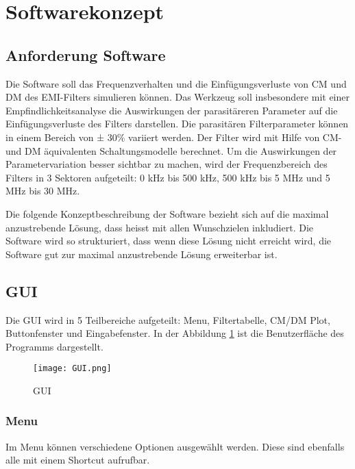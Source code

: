 \section{Softwarekonzept} \label{sec:softwarekonzept}

\subsection{Anforderung Software} \label{subsec:anforderungSoftware}

Die Software soll das Frequenzverhalten und die Einfügungsverluste von CM und DM des EMI-Filters simulieren können. Das Werkzeug soll insbesondere mit einer Empfindlichkeitsanalyse die Auswirkungen der parasitäreren Parameter auf die Einfügungsverluste des Filters darstellen. Die parasitären Filterparameter können in einem Bereich von ± 30\% variiert werden. Der Filter wird mit Hilfe von CM- und DM äquivalenten Schaltungsmodelle berechnet. Um die Auswirkungen der Parametervariation besser sichtbar zu machen, wird der Frequenzbereich des Filters in 3 Sektoren aufgeteilt: 0 kHz bis 500 kHz, 500 kHz bis 5 MHz und 5 MHz bis 30 MHz. 

Die folgende Konzeptbeschreibung der Software bezieht sich auf die maximal anzustrebende Lösung, dass heisst mit allen Wunschzielen inkludiert. Die Software wird so strukturiert, dass wenn diese Lösung nicht erreicht wird, die Software gut zur  maximal anzustrebende Lösung erweiterbar ist.

\subsection{GUI} \label{subsec:GUI}

Die GUI wird in 5 Teilbereiche aufgeteilt: Menu, Filtertabelle, CM/DM Plot, Buttonfenster und Eingabefenster. In der Abbildung \ref{fig:GUI}  ist die Benutzerfläche des Programms dargestellt.

\begin{figure}[H]
	\centering
	\texttt{[image: GUI.png]}
	\caption{GUI}
	\label{fig:GUI}
\end{figure}

\newpage

\subsubsection{Menu} \label{subsubsec:menu}

Im Menu können verschiedene Optionen ausgewählt werden. Diese sind ebenfalls alle mit einem Shortcut aufrufbar.
\bigskip
{}
